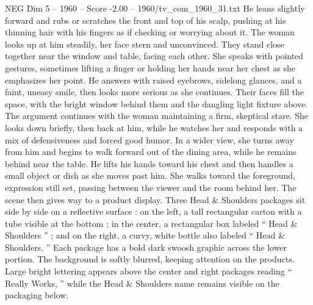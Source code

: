 \begin{textsample}{NEG Dim 5 – 1960 – Score -2.00 – 1960/tv\_com\_1960\_31.txt}
He leans slightly forward and rubs or scratches the front and top of his scalp, pushing at his thinning hair with his fingers as if checking or worrying about it.
The woman looks up at him steadily, her face stern and unconvinced.
They stand close together near the window and table, facing each other.
She speaks with pointed gestures, sometimes lifting a finger or holding her hands near her chest as she emphasizes her point.
He answers with raised eyebrows, sidelong glances, and a faint, uneasy smile, then looks more serious as she continues.
Their faces fill the space, with the bright window behind them and the dangling light fixture above.
The argument continues with the woman maintaining a firm, skeptical stare.
She looks down briefly, then back at him, while he watches her and responds with a mix of defensiveness and forced good humor.
In a wider view, she turns away from him and begins to walk forward out of the dining area, while he remains behind near the table.
He lifts his hands toward his chest and then handles a small object or dish as she moves past him.
She walks toward the foreground, expression still set, passing between the viewer and the room behind her.
The scene then gives way to a product display.
Three Head \& Shoulders packages sit side by side on a reflective surface : on the left, a tall rectangular carton with a tube visible at the bottom ; in the center, a rectangular box labeled “ Head \& Shoulders ” ; and on the right, a curvy, white bottle also labeled “ Head \& Shoulders. ” Each package has a bold dark swoosh graphic across the lower portion.
The background is softly blurred, keeping attention on the products.
Large bright lettering appears above the center and right packages reading “ Really Works, ” while the Head \& Shoulders name remains visible on the packaging below.

\end{textsample}
